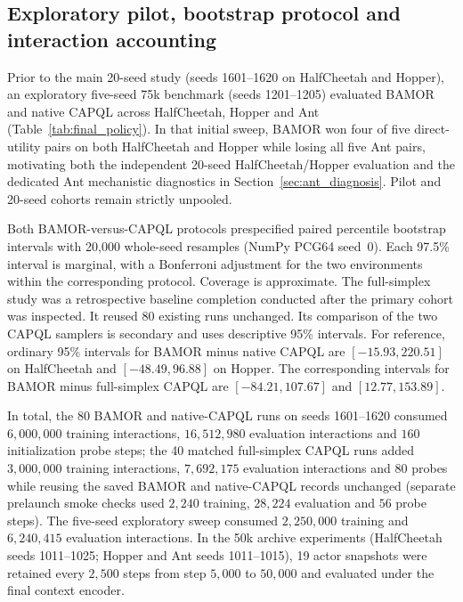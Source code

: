 \subsection{Exploratory pilot, bootstrap protocol and interaction accounting}
\label{app:experiment_details}

Prior to the main 20-seed study (seeds 1601--1620 on HalfCheetah and Hopper),
an exploratory five-seed 75k benchmark (seeds 1201--1205) evaluated BAMOR and
native CAPQL across HalfCheetah, Hopper and Ant (Table~\ref{tab:final_policy}).
In that initial sweep, BAMOR won four of five direct-utility pairs on both
HalfCheetah and Hopper while losing all five Ant pairs, motivating both the
independent 20-seed HalfCheetah/Hopper evaluation and the dedicated Ant
mechanistic diagnostics in Section~\ref{sec:ant_diagnosis}. Pilot and 20-seed
cohorts remain strictly unpooled.



Both BAMOR-versus-CAPQL protocols prespecified paired percentile bootstrap
intervals with 20,000 whole-seed resamples (NumPy PCG64 seed~0). Each 97.5\%
interval is marginal, with a Bonferroni adjustment for the two environments
within the corresponding protocol. Coverage is approximate. The full-simplex
study was a retrospective baseline completion conducted after the primary
cohort was inspected. It reused 80 existing runs unchanged. Its comparison
of the two CAPQL samplers is secondary and uses descriptive 95\% intervals.
For reference, ordinary 95\% intervals for BAMOR minus native CAPQL are
$[-15.93,220.51]$ on HalfCheetah and $[-48.49,96.88]$ on Hopper. The
corresponding intervals for BAMOR minus full-simplex CAPQL are
$[-84.21,107.67]$ and $[12.77,153.89]$.

In total, the 80 BAMOR and native-CAPQL runs on seeds 1601--1620 consumed
$6{,}000{,}000$ training interactions, $16{,}512{,}980$ evaluation interactions
and $160$ initialization probe steps; the 40 matched full-simplex CAPQL runs
added $3{,}000{,}000$ training interactions, $7{,}692{,}175$ evaluation
interactions and $80$ probes while reusing the saved BAMOR and native-CAPQL
records unchanged (separate prelaunch smoke checks used $2{,}240$ training,
$28{,}224$ evaluation and $56$ probe steps). The five-seed exploratory sweep
consumed $2{,}250{,}000$ training and $6{,}240{,}415$ evaluation interactions.
In the 50k archive experiments (HalfCheetah seeds 1011--1025; Hopper and Ant
seeds 1011--1015), 19 actor snapshots were retained every $2{,}500$ steps from
step $5{,}000$ to $50{,}000$ and evaluated under the final context encoder.
